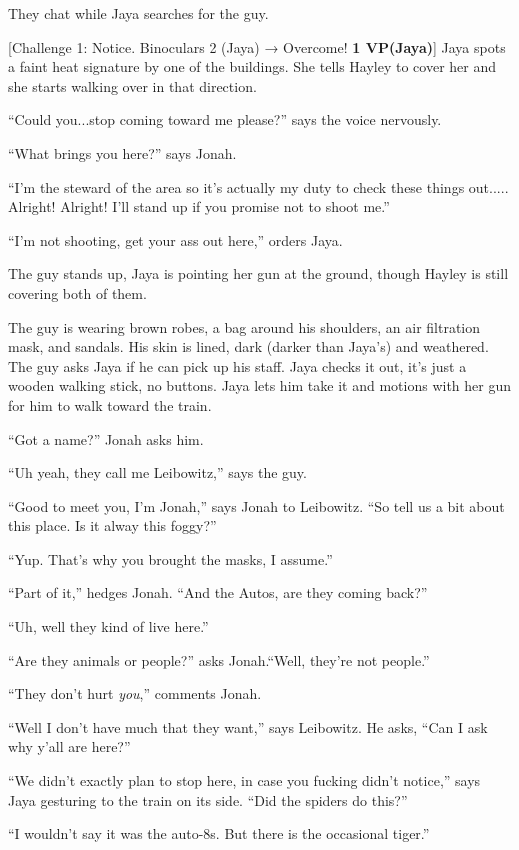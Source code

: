 They chat while Jaya searches for the guy.

{[}Challenge 1: Notice.  Binoculars 2 (Jaya) → Overcome! \textbf{1 VP(Jaya)}{]}  Jaya spots a faint heat signature by one of the buildings.  She tells Hayley to cover her and she starts walking over in that direction.

``Could you...stop coming toward me please?'' says the voice nervously.

``What brings you here?'' says Jonah.

``I'm the steward of the area so it's actually my duty to check these things out..... Alright!  Alright!  I'll stand up if you promise not to shoot me.''

``I'm not shooting, get your ass out here,'' orders Jaya.

The guy stands up, Jaya is pointing her gun at the ground, though Hayley is still covering both of them.



The guy is wearing brown robes, a bag around his shoulders, an air filtration mask, and sandals.  His skin is lined, dark (darker than Jaya's) and weathered.  The guy asks Jaya if he can pick up his staff.  Jaya checks it out, it's just a wooden walking stick, no buttons.  Jaya lets him take it and motions with her gun for him to walk toward the train.

``Got a name?'' Jonah asks him.

``Uh yeah, they call me Leibowitz,'' says the guy.

``Good to meet you, I'm Jonah,'' says Jonah to Leibowitz.  ``So tell us a bit about this place.  Is it alway this foggy?''

``Yup. That's why you brought the masks, I assume.''

``Part of it,'' hedges Jonah.  ``And the Autos, are they coming back?'' 

``Uh, well they kind of live here.''

``Are they animals or people?'' asks Jonah.``Well, they're not people.''

``They don't hurt \textit{you},'' comments Jonah.

``Well I don't have much that they want,'' says Leibowitz.  He asks, ``Can I ask why y'all are here?''

``We didn't exactly plan to stop here, in case you fucking didn't notice,'' says Jaya gesturing to the train on its side.  ``Did the spiders do this?''

``I wouldn't say it was the auto-8s.  But there is the occasional tiger.''

